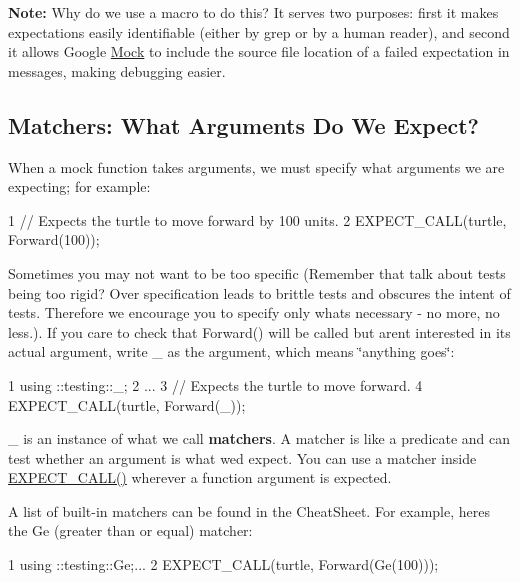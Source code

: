 {\bfseries Note\+:} Why do we use a macro to do this? It serves two purposes\+: first it makes expectations easily identifiable (either by {\ttfamily grep} or by a human reader), and second it allows Google \hyperlink{classMock}{Mock} to include the source file location of a failed expectation in messages, making debugging easier.

\subsection*{Matchers\+: What Arguments Do We Expect?}

When a mock function takes arguments, we must specify what arguments we are expecting; for example\+:


\begin{DoxyCode}
1 // Expects the turtle to move forward by 100 units.
2 EXPECT\_CALL(turtle, Forward(100));
\end{DoxyCode}


Sometimes you may not want to be too specific (Remember that talk about tests being too rigid? Over specification leads to brittle tests and obscures the intent of tests. Therefore we encourage you to specify only what\textquotesingle{}s necessary -\/ no more, no less.). If you care to check that {\ttfamily Forward()} will be called but aren\textquotesingle{}t interested in its actual argument, write {\ttfamily \+\_\+} as the argument, which means \char`\"{}anything goes\char`\"{}\+:


\begin{DoxyCode}
1 using ::testing::\_;
2 ...
3 // Expects the turtle to move forward.
4 EXPECT\_CALL(turtle, Forward(\_));
\end{DoxyCode}


{\ttfamily \+\_\+} is an instance of what we call {\bfseries matchers}. A matcher is like a predicate and can test whether an argument is what we\textquotesingle{}d expect. You can use a matcher inside {\ttfamily \hyperlink{gmock-spec-builders_8h_a535a6156de72c1a2e25a127e38ee5232}{E\+X\+P\+E\+C\+T\+\_\+\+C\+A\+L\+L()}} wherever a function argument is expected.

A list of built-\/in matchers can be found in the Cheat\+Sheet. For example, here\textquotesingle{}s the {\ttfamily Ge} (greater than or equal) matcher\+:


\begin{DoxyCode}
1 using ::testing::Ge;...
2 EXPECT\_CALL(turtle, Forward(Ge(100)));
\end{DoxyCode}


